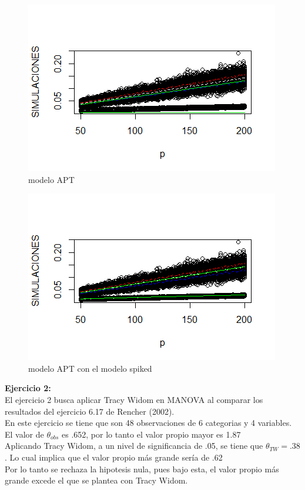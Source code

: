 \documentclass[paper=letter, fontsize=14pt]{scrartcl}
\numberwithin{equation}{section} %
\numberwithin{figure}{section} %
\numberwithin{table}{section} %
\begin{document}
\begin{figure}[h]
\centering
\includegraphics[scale=1]{i1.png} 
\caption{modelo APT}
\end{figure}

\begin{figure}[h]
\centering
\includegraphics[scale=1]{i2.png} 
\caption{modelo APT con el modelo spiked}
\end{figure}


\pagebreak

\textbf{Ejercicio 2:}\\
El ejercicio 2 busca aplicar Tracy Widom en MANOVA al comparar los resultados del ejercicio 6.17 de Rencher (2002).\\

En este ejercicio se tiene que son 48 observaciones de 6 categorias y 4 variables. \\

El valor de $\theta_{obs}$ es .652, por lo tanto el valor propio mayor es 1.87\\

Aplicando Tracy Widom, a un nivel de significancia de .05, se tiene que $\theta_{TW}=.38$. Lo cual implica que el valor propio más grande sería de .62\\

Por lo tanto se rechaza la hipotesis nula, pues bajo esta, el valor propio más grande excede el que se plantea con Tracy Widom.

\pagebreak
\end{document}
